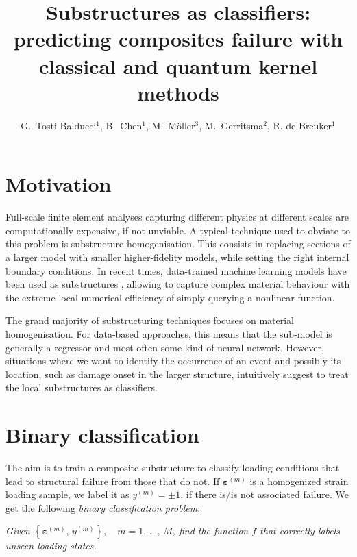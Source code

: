\documentclass[9pt,a4paper]{extarticle}
\title{%
Substructures as classifiers: predicting composites failure with\\ classical and quantum kernel methods%
}
\author{%
G.\ Tosti Balducci$^1$, B.\ Chen$^1$,
M.\ M\"{o}ller$^3$, M.\ Gerritsma$^2$,
R. de Breuker$^1$%
}
\affiliation{%
$^1$ TU Delft, Aerospace Structures and Materials\\%
$^2$ TU Delft, Flow Physics and Technology\\%
$^3$ TU Delft, Applied Mathematics%
}
\begin{document}
\maketitle
\begin{multicols}{2}

\section{Motivation}
Full-scale finite element analyses capturing different physics at different scales are computationally expensive, if not unviable. A typical technique used to obviate to this problem is substructure homogenisation. This consists in replacing sections of a larger model with smaller higher-fidelity models, while setting the right internal boundary conditions. In recent times, data-trained machine learning models have been used as substructures \cite{TGullikers}, allowing to capture complex material behaviour with the extreme local numerical efficiency of simply querying a nonlinear function.

The grand majority of substructuring techniques focuses on material homogenisation. For data-based approaches, this means that the sub-model is generally a regressor and most often some kind of neural network. However, situations where we want to identify the occurrence of an event and possibly its location, such as damage onset in the larger structure, intuitively suggest to treat the local substructures as classifiers.

\section{Binary classification}
The aim is to train a composite substructure to classify loading conditions that lead to structural failure from those that do not. If $\bm{\varepsilon}^{(m)}$ is a homogenized strain loading sample, we label it as $y^{(m)} = \pm 1$, if there is/is not associated failure. We get the following \emph{binary classification problem}:
\begin{center}
    \emph{
    Given $\left\{ \bm{\varepsilon}^{(m)},\, y^{(m)}\right\},\quad m=1,\,\dots,\, M$, find the function $f$ that correctly labels unseen loading states.
    }
\end{center}


\end{multicols}
\end{document}
